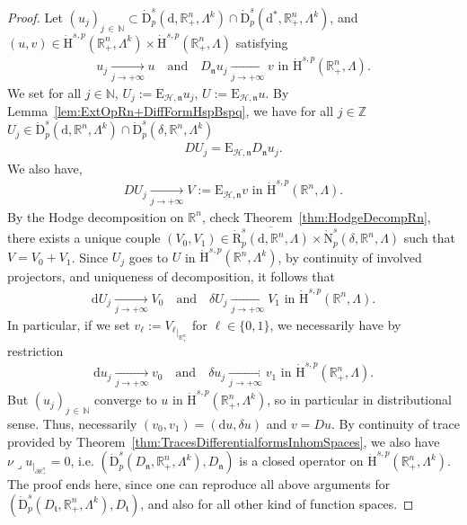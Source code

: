 \documentclass[10pt]{amsart}
\theoremstyle{definition}\newtheorem{defi}[theo]{Definition}\newtheorem{rema}[theo]{Remark}\newtheorem{exam}[theo]{Example}\newtheorem{exem}[theo]{Example}\newtheorem{nota}[theo]{Notation}
\newcommand{\bbR}{\mathbb{R}}
\newcommand{\bbN}{\mathbb{N}}
\newcommand{\bbZ}{\mathbb{Z}}
\newcommand{\rmH}{\mathrm{H}}%
\newcommand{\rmd}{\mathrm{d}}
\newcommand{\rmD}{\mathrm{D}}
\newcommand{\rmR}{\mathrm{R}}
\newcommand{\rmE}{\mathrm{E}}
\newcommand{\rmN}{\mathrm{N}}
\newcommand{\clH}{\mathcal{H}}
\newcommand{\fkn}{\mathfrak{n}}
\newcommand{\fkt}{\mathfrak{t}}
\newcommand{\iprod}{\mathbin{\lrcorner}}
\begin{document}
\begin{proof}
Let $(u_j)_{j\,\in\,\bbN }\subset \dot{\rmD}^{s}_{p}(\rmd,\bbR^n_+,\Lambda^k)\cap \dot{\rmD}^{s}_{p}(\rmd^\ast,\bbR^n_+,\Lambda^k)$, and $(u,v)\in\dot{\rmH}^{s,p}(\bbR^n_+,\Lambda^k)\times\dot{\rmH}^{s,p}(\bbR^n_+, \Lambda)$ satisfying
\begin{align*}
u_j \xrightarrow[j\rightarrow +\infty]{} u \quad\text{and}\quad D_\fkn u_j \xrightarrow[j\rightarrow +\infty]{} v \text{ in } \dot{\rmH}^{s,p}\left(\bbR^n_+,\Lambda\right).
\end{align*}
We set for all $j\in\bbN $, $U_j:=\rmE_{\clH,\fkn}u_j$, $U:=\rmE _{\clH,\fkn}u$. By Lemma~\ref{lem:ExtOpRn+DiffFormHspBspq}, we have for all $j\in\bbZ$ $U_j\in\dot{\rmD}^{s}_{p}(\rmd,\bbR^n,\Lambda^k)\cap \dot{\rmD}^{s}_{p}(\delta,\bbR^n,\Lambda^k)$
\begin{align*}
D U_j = \rmE _{\clH,\fkn}D_\fkn u_j.
\end{align*}
We also have,
\begin{align*}
D U_j \xrightarrow[j\rightarrow +\infty]{} V:=\rmE _{\clH,\fkn}v\text{ in } \dot{\rmH}^{s,p}(\bbR^n,\Lambda).
\end{align*}
By the Hodge decomposition on $\bbR^n$, check Theorem~\ref{thm:HodgeDecompRn}, there exists a unique couple $({V}_{0},{V}_{1})\in \overline{\dot{\rmR}^{s}_{p}({\rmd},\bbR^n,\Lambda)}\times \dot{\rmN}^{s}_{p}(\delta,\bbR^n,\Lambda)$ such that $V={V}_{0}+{V}_{1}$. Since $U_j$ goes to $U$ in $\dot{\rmH}^{s,p}(\bbR^n,\Lambda^k)$, by continuity of involved projectors, and uniqueness of decomposition, it follows that
\begin{align*}
\rmd U_j \xrightarrow[j\rightarrow +\infty]{} V_0 \quad\text{and}\quad \delta U_j \xrightarrow[j\rightarrow +\infty]{} V_1 \text{ in } \dot{\rmH}^{s,p}\left(\bbR^n,\Lambda\right).
\end{align*}
In particular, if we set $v_\ell:= {V_\ell}_{|_{\bbR^n_+}}$ for $\ell\in\{0,1\}$, we necessarily have by restriction
\begin{align*}
\rmd u_j \xrightarrow[j\rightarrow +\infty]{} v_0 \quad\text{and}\quad \delta u_j \xrightarrow[j\rightarrow +\infty]{} v_1 \text{ in } \dot{\rmH}^{s,p}\left(\bbR^n_+,\Lambda\right).
\end{align*}
But $(u_j)_{j\,\in\,\bbN }$ converge to $u$ in $\dot{\rmH}^{s,p}(\bbR^n_+,\Lambda^k)$, so in particular in distributional sense. Thus, necessarily $(v_0,v_1)=(\rmd u,\delta u)$ and $v=D u$. By continuity of trace provided by Theorem~\ref{thm:TracesDifferentialformsInhomSpaces}, we also have $\nu\iprod u_{|_{\partial\bbR^n_+}} =0$, i.e. $(\dot{\rmD}^{s}_p(D_{\fkn},\bbR^n_+,\Lambda^k),D_{\fkn})$ is a closed operator on $\dot{\rmH}^{s,p}(\bbR^n_+,\Lambda^k)$. The proof ends here, since one can reproduce all above arguments for $(\dot{\rmD}^{s}_p(D_{\fkt},\bbR^n_+,\Lambda^k),D_{\fkt})$, and also for all other kind of function spaces.
\end{proof}
\end{document}
